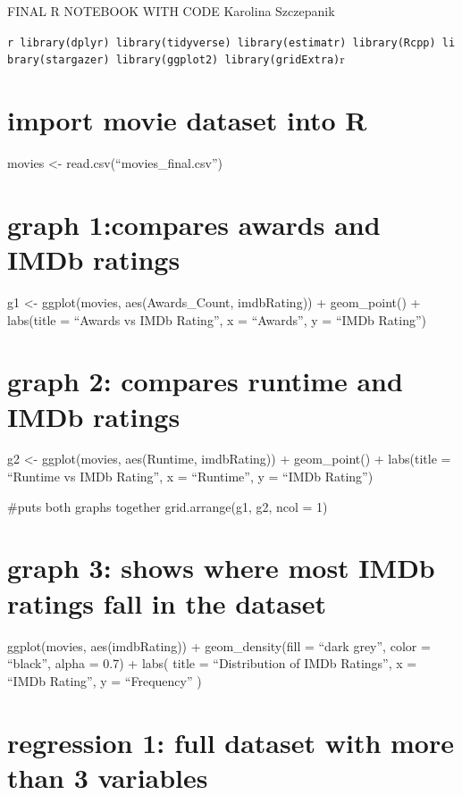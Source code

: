 \documentclass[
]{article}
\author{}
\date{\vspace{-2.5em}}
\begin{document}
FINAL R NOTEBOOK WITH CODE Karolina Szczepanik

\texttt{r\ library(dplyr)\ library(tidyverse)\ library(estimatr)\ library(Rcpp)\ library(stargazer)\ library(ggplot2)\ library(gridExtra)}r

\section{import movie dataset into R}\label{import-movie-dataset-into-r}

movies \textless- read.csv(``movies\_final.csv'')

\section{graph 1:compares awards and IMDb
ratings}\label{graph-1compares-awards-and-imdb-ratings}

g1 \textless- ggplot(movies, aes(Awards\_Count, imdbRating)) +
geom\_point() + labs(title = ``Awards vs IMDb Rating'', x = ``Awards'',
y = ``IMDb Rating'')

\section{graph 2: compares runtime and IMDb
ratings}\label{graph-2-compares-runtime-and-imdb-ratings}

g2 \textless- ggplot(movies, aes(Runtime, imdbRating)) + geom\_point() +
labs(title = ``Runtime vs IMDb Rating'', x = ``Runtime'', y = ``IMDb
Rating'')

\#puts both graphs together grid.arrange(g1, g2, ncol = 1)

\section{graph 3: shows where most IMDb ratings fall in the
dataset}\label{graph-3-shows-where-most-imdb-ratings-fall-in-the-dataset}

ggplot(movies, aes(imdbRating)) + geom\_density(fill = ``dark grey'',
color = ``black'', alpha = 0.7) + labs( title = ``Distribution of IMDb
Ratings'', x = ``IMDb Rating'', y = ``Frequency'' )

\section{regression 1: full dataset with more than 3
variables}\label{regression-1-full-dataset-with-more-than-3-variables}
\end{document}
